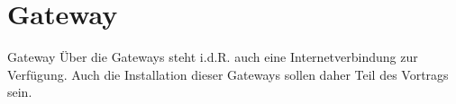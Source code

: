 \section{Gateway}

\begin{frame}{Gateway}
Über die Gateways steht i.d.R. auch eine Internetverbindung zur
Verfügung. Auch die Installation dieser Gateways sollen daher Teil
des Vortrags sein.
\end{frame}
